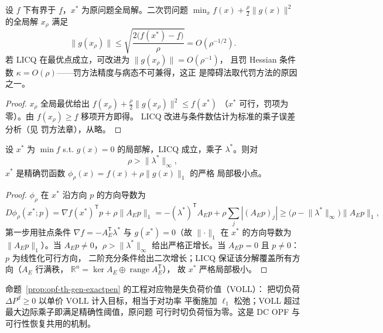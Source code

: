 \begin{lemma}[二次罚的误差界]\label{lem:opf-th-gen-quadpen}
设 $f$ 下有界于 $\underline f$，$x^*$ 为原问题全局解。二次罚问题
$\min_x f(x)+\frac{\rho}{2}\lVert g(x)\rVert^2$ 的全局解 $x_\rho$ 满足
\begin{equation}
\lVert g(x_\rho)\rVert\le\sqrt{\frac{2\bigl(f(x^*)-\underline f\bigr)}{\rho}}
=O(\rho^{-1/2}).
\end{equation}
若 LICQ 在最优点成立，可改进为 $\lVert g(x_\rho)\rVert=O(\rho^{-1})$，
且罚 Hessian 条件数 $\kappa=O(\rho)$——罚方法精度与病态不可兼得，这正
是障碍法取代罚方法的原因之一\cite{opft:fiacco-mccormick}。
\end{lemma}

\begin{proof}
$x_\rho$ 全局最优给出
$f(x_\rho)+\frac{\rho}{2}\lVert g(x_\rho)\rVert^2\le f(x^*)$
（$x^*$ 可行，罚项为零）。由 $f(x_\rho)\ge\underline f$ 移项开方即得。
LICQ 改进与条件数估计为标准的乘子误差分析（见 \cite{opft:nocedal-wright}
罚方法章），从略。
\end{proof}

\begin{proposition}\label{prop:opf-th-gen-exactpen}
设 $x^*$ 为 $\min f$ s.t. $g(x)=0$ 的局部解，LICQ 成立，乘子
$\lambda^*$。则对
\begin{equation}
\rho>\lVert\lambda^*\rVert_\infty,
\end{equation}
$x^*$ 是精确罚函数 $\phi_\rho(x)=f(x)+\rho\lVert g(x)\rVert_1$ 的严格
局部极小点\cite{opft:nocedal-wright}。
\end{proposition}

\begin{proof}
$\phi_\rho$ 在 $x^*$ 沿方向 $p$ 的方向导数为
\begin{equation}
D\phi_\rho(x^*;p)=\nabla f(x^*)^{\mathsf T}p+\rho\lVert A_Ep\rVert_1
=-(\lambda^*)^{\mathsf T}A_Ep+\rho\sum_j|(A_Ep)_j|
\ge\bigl(\rho-\lVert\lambda^*\rVert_\infty\bigr)\lVert A_Ep\rVert_1,
\end{equation}
第一步用驻点条件 $\nabla f=-A_E^{\mathsf T}\lambda^*$ 与
$g(x^*)=0$（故 $\lVert\cdot\rVert_1$ 在 $x^*$ 的方向导数为
$\lVert A_Ep\rVert_1$）。当 $A_Ep\neq0$，$\rho>\lVert\lambda^*\rVert_\infty$
给出严格正增长。当 $A_Ep=0$ 且 $p\neq0$：$p$ 为线性化可行方向，
二阶充分条件给出二次增长；LICQ 保证该分解覆盖所有方向（$A_E$ 行满秩，
$\mathbb R^n=\ker A_E\oplus\operatorname{range}A_E^{\mathsf T}$），
故 $x^*$ 严格局部极小。
\end{proof}

\begin{remark}\label{rem:opf-th-gen-voll}
命题~\ref{prop:opf-th-gen-exactpen} 的工程对应物是失负荷价值（VOLL）：
把切负荷 $\Delta P^d\ge0$ 以单价 $\mathrm{VOLL}$ 计入目标，相当于对功率
平衡施加 $\ell_1$ 松弛；VOLL 超过最大边际乘子即满足精确性阈值，原问题
可行时切负荷恒为零。这是 DC OPF 与可行性恢复共用的机制。
\end{remark}

